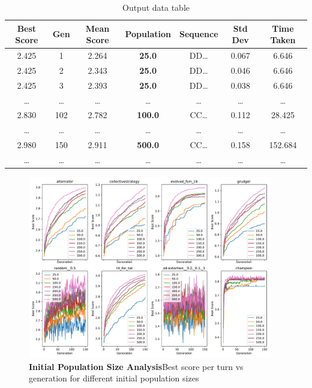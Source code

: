 \begin{table}
    \centering
    \begin{tabular}{ccccccc}
        \toprule
        Best Score & Gen & Mean Score & Population & Sequence & Std Dev & Time Taken \\
        \midrule
        2.425 & 1 & 2.264 & \textbf{25.0} & DD\ldots & 0.067 & 6.646\\
        2.425 & 2 & 2.343 & \textbf{25.0} & DD\ldots & 0.046 & 6.646\\
        2.425 & 3 & 2.393 & \textbf{25.0} & DD\ldots & 0.038 & 6.646\\
        \ldots  & \ldots  & \ldots  & \ldots  & \ldots  & \ldots  & \ldots \\
        2.830 & 102 & 2.782 & \textbf{100.0} & CC\ldots & 0.112 & 28.425\\
        \ldots  & \ldots  & \ldots  & \ldots  & \ldots  & \ldots  & \ldots \\
        2.980 & 150 & 2.911 & \textbf{500.0} & CC\ldots & 0.158 & 152.684\\
        \ldots  & \ldots  & \ldots  & \ldots  & \ldots  & \ldots  & \ldots \\
        \bottomrule
    \end{tabular}
    \caption{Output data table}\label{table:popCheckerDataTable}
\end{table}

\begin{figure}[ht]
    \includegraphics[width=0.95\textwidth, keepaspectratio, center]{./img/plots/INIT_POP_bs_v_gens_all.pdf}
    \caption{\textbf{Initial Population Size Analysis}Best score per turn vs generation for different initial population sizes}\label{fig:INIT-POP-bs-v-gens-all}
\end{figure}

